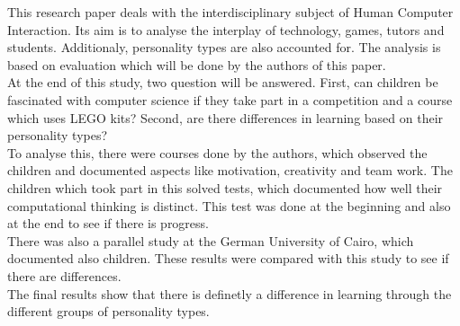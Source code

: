 This research paper deals with the interdisciplinary subject of Human Computer Interaction. Its aim is to analyse the interplay of technology, games, tutors and students. Additionaly, personality types are also accounted for. The analysis is based on evaluation which will be done by the authors of this paper.\\
At the end of this study, two question will be answered. First, can children be fascinated with computer science if they take part in a competition and a course which uses LEGO kits? Second, are there differences in learning based on their personality types?\\
To analyse this, there were courses done by the authors, which observed the children and documented aspects like motivation, creativity and team work. The children which took part in this solved tests, which documented how well their computational thinking is distinct. This test was done at the beginning and also at the end to see if there is progress.\\
There was also a parallel study at the German University of Cairo, which documented also children. These results were compared with this study to see if there are differences.\\
The final results show that there is definetly a difference in learning through the different groups of personality types.